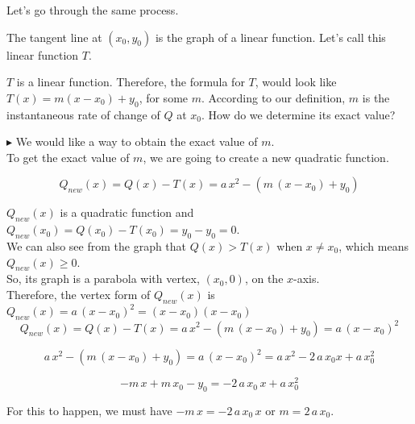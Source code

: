 \documentclass{ximera}
\begin{document}
Let's go through the same process. \\


\begin{explanation}

The tangent line at $(x_0, y_0)$ is the graph of a linear function. Let's call this linear function $T$.


$T$ is a linear function. Therefore, the formula for $T$, would look like $T(x) = m(x - x_0) + y_0$, for some $m$.  According to our definition, $m$ is the instantaneous rate of change of $Q$ at $x_0$.  How do we determine its exact value?


$\blacktriangleright$ We would like a way to obtain the exact value of $m$. \\



To get the exact value of $m$, we are going to create a new quadratic function.



\[
Q_{new}(x) = Q(x) - T(x) = a \, x^2 - (m \, (x - x_0) + y_0)
\]



$Q_{new}(x)$ is a quadratic function and $Q_{new}(x_0) = Q(x_0) - T(x_0) = y_0 - y_0 = 0$. \\

We can also see from the graph that $Q(x) > T(x)$ when $x \ne x_0$, which means $Q_{new}(x) \geq 0$.\\


So, its graph is a parabola with vertex, $(x_0, 0)$, on the $x$-axis.  \\


Therefore, the vertex form of $Q_{new}(x)$ is $Q_{new}(x) = a \, (x - x_0)^2 = (x - x_0)(x - x_0)$  \\






\[
Q_{new}(x) = Q(x) - T(x) = a \, x^2 - (m \, (x - x_0) + y_0) = a \, (x - x_0)^2
\]




\[
a \, x^2 - (m \, (x - x_0) + y_0) = a \, (x - x_0)^2 = a \, x^2 - 2 \, a \, x_0 x + a \, x_0^2
\]



\[
 -m \, x + m \, x_0 - y_0 =   - 2 \, a \, x_0 \, x + a \, x_0^2
\]


For this to happen, we must have $-m \, x = - 2 \, a \, x_0 \, x$ or \textbf{$m = 2 \, a \, x_0$}. \\


\end{explanation}
\end{document}
